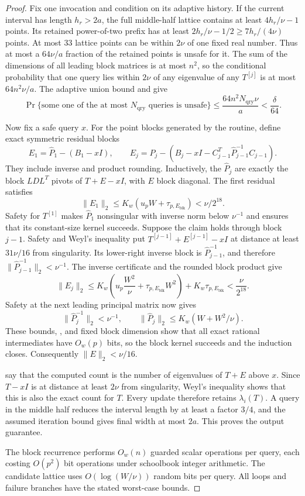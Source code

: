 \documentclass[11pt]{article}
\begin{document}
\begin{proof}
Fix one invocation and condition on its adaptive history.  If the current
interval has length $h_r>2a$, the full middle-half lattice contains at least
$4h_r/\nu-1$ points.  Its retained power-of-two prefix has at least
$2h_r/\nu-1/2\geq7h_r/(4\nu)$ points.  At most $33$ lattice points can be
within $2\nu$ of one fixed real number.  Thus at most a $64\nu/a$ fraction
of the retained points is unsafe for it.  The sum of the dimensions of all
leading block matrices is at most $n^2$, so the conditional probability that
one query lies within $2\nu$ of any eigenvalue of any $T^{[j]}$ is at most
$64n^2\nu/a$.  The adaptive union bound and  give
\[
 \Pr\{\text{some one of the at most $N_{\mathrm{qry}}$ queries is unsafe}\}
 \leq\frac{64n^2N_{\mathrm{qry}}\nu}{a}<\frac\delta{64}.
\]

Now fix a safe query $x$.  For the point blocks generated by the routine,
define exact symmetric residual blocks
\[
 E_1=\widehat P_1-(B_1-xI),
 \qquad
 E_j=\widehat P_j-
 (B_j-xI-C_{j-1}^T\widehat P_{j-1}^{-1}C_{j-1}).
\]
They include inverse and product rounding.  Inductively, the
$\widehat P_j$ are exactly the block $LDL^T$ pivots of $T+E-xI$, with $E$
block diagonal.  The first residual satisfies
\[
 \lVert E_1\rVert_2\leq
 K_w(u_pW+\tau_{p,E_{\mathrm{blk}}})<\nu/2^{18}.
\]
Safety for $T^{[1]}$ makes $\widehat P_1$ nonsingular with inverse norm below
$\nu^{-1}$ and ensures that its constant-size kernel succeeds.  Suppose the
claim holds through block $j-1$.  Safety and Weyl's inequality put
$T^{[j-1]}+E^{[j-1]}-xI$ at distance at least $31\nu/16$ from singularity.
Its lower-right inverse block is $\widehat P_{j-1}^{-1}$, and therefore
$\lVert\widehat P_{j-1}^{-1}\rVert_2<\nu^{-1}$.  The inverse certificate and
the rounded block product give
\[
 \lVert E_j\rVert_2
 \leq K_w\left(u_p\frac{W^2}{\nu}
   +\tau_{p,E_{\mathrm{blk}}}W^2\right)
   +K_w\tau_{p,E_{\mathrm{blk}}}
 <\frac\nu{2^{18}}.
\]
Safety at the next leading principal matrix now gives
\[
 \lVert\widehat P_j^{-1}\rVert_2<\nu^{-1},
 \qquad
 \lVert\widehat P_j\rVert_2\leq K_w(W+W^2/\nu).
\]
These bounds, , and fixed block dimension show
that all exact rational intermediates have $O_w(p)$ bits, so the block kernel
succeeds and the induction closes.  Consequently
$\lVert E\rVert_2<\nu/16$.

 say that the
computed count is the number of eigenvalues of $T+E$ above $x$.  Since
$T-xI$ is at distance at least $2\nu$ from singularity, Weyl's inequality
 shows that this is also the exact count for $T$.  Every update
therefore retains $\lambda_i(T)$.  A query in the middle half reduces the
interval length by at least a factor $3/4$, and the assumed iteration bound
gives final width at most $2a$.  This proves the output guarantee.

The block recurrence performs $O_w(n)$ guarded scalar operations per query,
each costing $O(p^2)$ bit operations under schoolbook integer arithmetic.
The candidate lattice uses $O(\log(W/\nu))$ random bits per query.  All loops
and failure branches have the stated worst-case bounds.
\end{proof}
\end{document}
